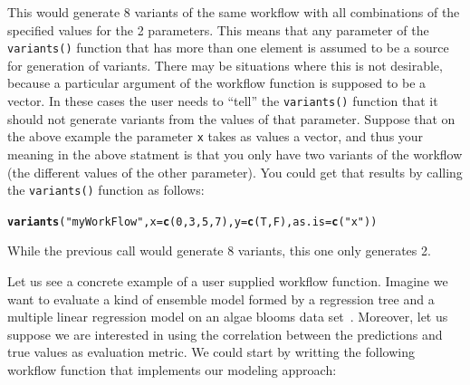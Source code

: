 \documentclass[10pt,a4paper]{article}\usepackage[]{graphicx}\usepackage[]{color}
\makeatletter
\newcommand{\hlnum}[1]{\textcolor[rgb]{0.686,0.059,0.569}{#1}}%
\newcommand{\hlstr}[1]{\textcolor[rgb]{0.192,0.494,0.8}{#1}}%
\newcommand{\hlstd}[1]{\textcolor[rgb]{0.345,0.345,0.345}{#1}}%
\newcommand{\hlkwc}[1]{\textcolor[rgb]{0.333,0.667,0.333}{#1}}%
\newcommand{\hlkwd}[1]{\textcolor[rgb]{0.737,0.353,0.396}{\textbf{#1}}}%
\newenvironment{kframe}{%
 \def\at@end@of@kframe{}%
 \ifinner\ifhmode%
  \def\at@end@of@kframe{\end{minipage}}%
  \begin{minipage}{\columnwidth}%
 \fi\fi%
 \def\FrameCommand##1{\hskip\@totalleftmargin \hskip-\fboxsep
 \colorbox{shadecolor}{##1}\hskip-\fboxsep
     \hskip-\linewidth \hskip-\@totalleftmargin \hskip\columnwidth}%
 \MakeFramed {\advance\hsize-\width
   \@totalleftmargin\z@ \linewidth\hsize
   \@setminipage}}%
 {\par\unskip\endMakeFramed%
 \at@end@of@kframe}
\newenvironment{knitrout}{}{} %
\makeatother
\begin{document}
This would generate 8 variants of the same workflow with all
combinations of the specified values for the 2 parameters.  This means
that any parameter of the \texttt{variants()} function that has more
than one element is assumed to be a source for generation of
variants. There may be situations where this is not desirable, because
a particular argument of the workflow function is supposed to be a
vector. In these cases the user needs to ``tell'' the
\texttt{variants()} function that it should not generate variants from
the values of that parameter. Suppose that on the above example the
parameter \texttt{x} takes as values a vector, and thus your meaning
in the above statment is that you only have two variants of the
workflow (the different values of the other parameter). You could get
that results by calling the \texttt{variants()} function as follows:

\begin{knitrout}
\color{fgcolor}\begin{kframe}
\begin{alltt}
\hlkwd{variants}\hlstd{(}\hlstr{"myWorkFlow"}\hlstd{,} \hlkwc{x} \hlstd{=} \hlkwd{c}\hlstd{(}\hlnum{0}\hlstd{,} \hlnum{3}\hlstd{,} \hlnum{5}\hlstd{,} \hlnum{7}\hlstd{),} \hlkwc{y} \hlstd{=} \hlkwd{c}\hlstd{(T, F),} \hlkwc{as.is} \hlstd{=} \hlkwd{c}\hlstd{(}\hlstr{"x"}\hlstd{))}
\end{alltt}
\end{kframe}
\end{knitrout}


While the previous call would generate 8 variants, this one only generates 2.

Let us see a concrete example of a user supplied workflow
function. Imagine we want to evaluate a kind of ensemble model formed
by a regression tree and a multiple linear regression model on an
algae blooms data set~\cite{Tor10}. Moreover, let us suppose we are
interested in using the correlation between the predictions and true
values as evaluation metric. We could start by writting the following
workflow function that implements our modeling approach:
\end{document}
